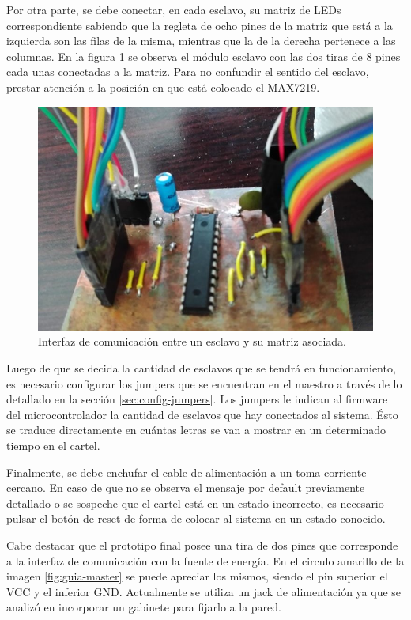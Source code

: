 Por otra parte, se debe conectar, en cada esclavo, su matriz de LEDs correspondiente sabiendo que la regleta de ocho pines de la matriz que está a la izquierda son las filas de la misma, mientras que la de la derecha pertenece a las columnas. En la figura \ref{fig:regleta} se observa el módulo esclavo con las dos tiras de 8 pines cada unas conectadas a la matriz.
Para no confundir el sentido del esclavo, prestar atención a la posición en que está colocado el MAX7219.

\begin{figure}[!ht]
	\centering
	\includegraphics[width=.75\linewidth]{imagenes/guia/regleta.jpeg}
	\caption{Interfaz de comunicación entre un esclavo y su matriz asociada.}
	\label{fig:regleta}
\end{figure}

Luego de que se decida la cantidad de esclavos que se tendrá en funcionamiento, es necesario configurar los jumpers que se encuentran en el maestro a través de lo detallado en la sección \ref{sec:config-jumpers}.
Los jumpers le indican al firmware del microcontrolador la cantidad de esclavos que hay conectados al sistema.
Ésto se traduce directamente en cuántas letras se van a mostrar en un determinado tiempo en el cartel.

Finalmente, se debe enchufar el cable de alimentación a un toma corriente cercano. En caso de que no se observa el mensaje por default previamente detallado o se sospeche que el cartel está en un estado incorrecto, es necesario pulsar el botón de reset de forma de colocar al sistema en un estado conocido.

Cabe destacar que el prototipo final posee una tira de dos pines que corresponde a la interfaz de comunicación con la fuente de energía. En el circulo amarillo de la imagen \ref{fig:guia-master} se puede apreciar los mismos, siendo el pin superior el VCC y el inferior GND. Actualmente se utiliza un jack de alimentación ya que se analizó en incorporar un gabinete para fijarlo a la pared. 

